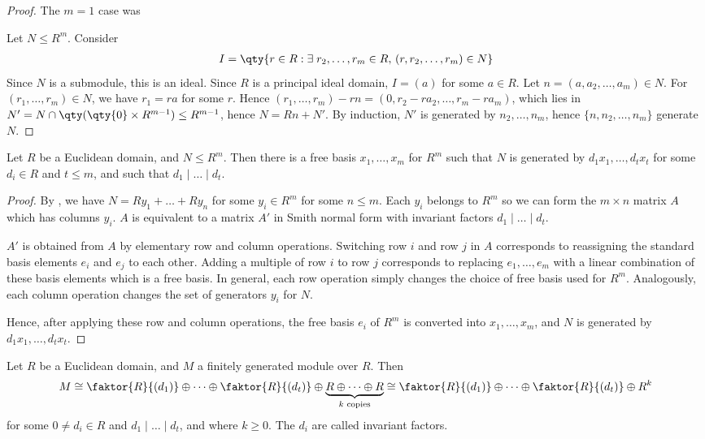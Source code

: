 \begin{proof}
	The $m=1$ case was \label{lem:14.4}

	Let $N \leq R^m$.
	Consider
	\begin{align*}
		I = \qty{r \in R : \exists \; r_2, \dots, r_m \in R,\, (r,r_2, \dots, r_m) \in N}
	\end{align*}
	Since $N$ is a submodule, this is an ideal.
	Since $R$ is a principal ideal domain, $I = (a)$ for some $a \in R$.
	Let $n = (a, a_2, \dots, a_m) \in N$.
	For $(r_1, \dots, r_m) \in N$, we have $r_1 = ra$ for some $r$.
	Hence $(r_1, \dots, r_m) - rn = (0,r_2 - ra_2, \dots, r_m - ra_m)$, which lies in $N' = N \cap \qty(\qty{0} \times R^{m-1}) \leq R^{m-1}$, hence $N = Rn + N'$.
	By induction, $N'$ is generated by $n_2, \dots, n_m$, hence $\{n, n_2, \dots, n_m\}$ generate $N$.
\end{proof}

\begin{theorem} \label{thm:16.4}
	Let $R$ be a Euclidean domain, and $N \leq R^m$.
	Then there is a free basis $x_1, \dots, x_m$ for $R^m$ such that $N$ is generated by $d_1 x_1, \dots, d_t x_t$ for some $d_i \in R$ and $t \leq m$, and such that $d_1 \mid \dots \mid d_t$.
\end{theorem}

\begin{proof}
	By , we have $N = R y_1 + \dots + R y_n$ for some $y_i \in R^m$ for some $n \leq m$.
	Each $y_i$ belongs to $R^m$ so we can form the $m \times n$ matrix $A$ which has columns $y_i$.
	$A$ is equivalent to a matrix $A'$ in Smith normal form with invariant factors $d_1 \mid \dots \mid d_t$.

	$A'$ is obtained from $A$ by elementary row and column operations.
	Switching row $i$ and row $j$ in $A$ corresponds to reassigning the standard basis elements $e_i$ and $e_j$ to each other.
	Adding a multiple of row $i$ to row $j$ corresponds to replacing $e_1, \dots, e_m$ with a linear combination of these basis elements which is a free basis.
	In general, each row operation simply changes the choice of free basis used for $R^m$.
	Analogously, each column operation changes the set of generators $y_i$ for $N$.

	Hence, after applying these row and column operations, the free basis $e_i$ of $R^m$ is converted into $x_1, \dots, x_m$, and $N$ is generated by $d_1 x_1, \dots, d_t x_t$.
\end{proof}

\begin{theorem}
	Let $R$ be a Euclidean domain, and $M$ a finitely generated module over $R$.
	Then
	\begin{align*}
		M \cong \faktor{R}{(d_1)} \oplus \dots \oplus \faktor{R}{(d_t)} \oplus \underbrace{R \oplus \dots \oplus R}_{k \text{ copies}} \cong \faktor{R}{(d_1)} \oplus \dots \oplus \faktor{R}{(d_t)} \oplus R^k
	\end{align*}
	for some $0 \neq d_i \in R$ and $d_1 \mid \dots \mid d_t$, and where $k \geq 0$.
	The $d_i$ are called invariant factors.
\end{theorem}

